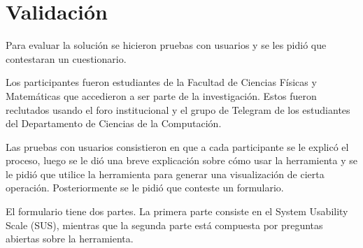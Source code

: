 \chapter{Validación}

Para evaluar la solución se hicieron pruebas con usuarios y se les pidió que contestaran un cuestionario. 

Los participantes fueron estudiantes de la Facultad de Ciencias Físicas y Matemáticas que accedieron a ser parte de la investigación. Estos fueron reclutados usando el foro institucional y el grupo de Telegram de los estudiantes del Departamento de Ciencias de la Computación.

Las pruebas con usuarios consistieron en que a cada participante se le explicó el proceso, luego se le dió una breve explicación sobre cómo usar la herramienta y se le pidió que utilice la herramienta para generar una visualización de cierta operación. Posteriormente se le pidió que conteste un formulario.

El formulario tiene dos partes. La primera parte consiste en el System Usability Scale (SUS), mientras que la segunda parte está compuesta por preguntas abiertas sobre la herramienta.
